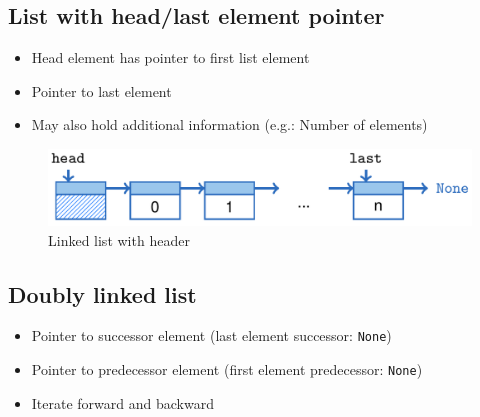 \documentclass[12pt, a4paper]{scrartcl}
\newcommand{\imgwidth}{.7\textwidth}
\begin{document}
\subsection{List with head/last element pointer}
\begin{itemize}
\item Head element has pointer to first list element
\item Pointer to last element
\item May also hold additional information (e.g.: Number of elements)
\end{itemize}
\begin{figure}[htbp]
  \centering
\includegraphics[width=\imgwidth]{header_linked_list}
\caption{Linked list with header}
\label{fig:header_linked_list}
\end{figure}
\subsection{Doubly linked list}
\begin{itemize}
\item Pointer to successor element (last element successor: \texttt{None})
\item Pointer to predecessor element (first element predecessor: \texttt{None})
\item Iterate forward and backward
\end{itemize}
\end{document}
